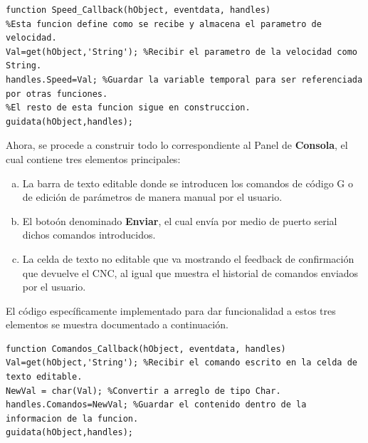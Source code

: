 \documentclass{article}
\begin{document}
\begin{multicols}{2}
\begin{itemize}
\begin{lstlisting}
function Speed_Callback(hObject, eventdata, handles)
%Esta funcion define como se recibe y almacena el parametro de velocidad.
Val=get(hObject,'String'); %Recibir el parametro de la velocidad como String.
handles.Speed=Val; %Guardar la variable temporal para ser referenciada por otras funciones.
%El resto de esta funcion sigue en construccion.
guidata(hObject,handles);
\end{lstlisting}
\end{itemize}
Ahora, se procede a construir todo lo correspondiente al Panel de \textbf{Consola}, el cual contiene tres elementos principales:
\begin{enumerate}[(a)]
\item La barra de texto editable donde se introducen los comandos de código G o de edición de parámetros de manera manual por el usuario.
\item El botoón denominado \textbf{Enviar}, el cual envía por medio de puerto serial dichos comandos introducidos.
\item La celda de texto no editable que va mostrando el feedback de confirmación que devuelve el CNC, al igual que muestra el historial de comandos enviados por el usuario.
\end{enumerate}
El código específicamente implementado para dar funcionalidad a estos tres elementos se muestra documentado a continuación.
\begin{lstlisting}
function Comandos_Callback(hObject, eventdata, handles)
Val=get(hObject,'String'); %Recibir el comando escrito en la celda de texto editable.
NewVal = char(Val); %Convertir a arreglo de tipo Char.
handles.Comandos=NewVal; %Guardar el contenido dentro de la informacion de la funcion.
guidata(hObject,handles);


\end{lstlisting}
\end{multicols}
\end{document}
